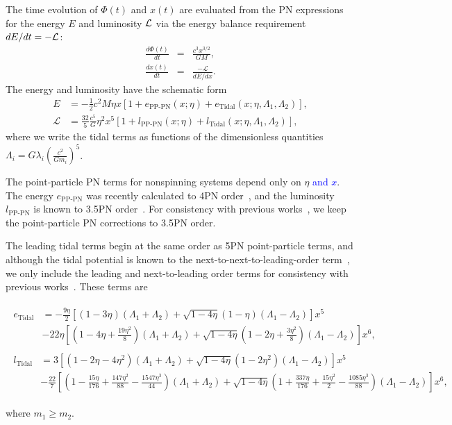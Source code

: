 \documentclass[twocolumn,prd,amssymb,aps,nofootinbib,showpacs,epsf]{revtex4}
\newcommand\les[2]{\textcolor{blue}{{#1}\sout{#2}}}
\begin{document}
The time evolution of $\Phi(t)$ and $x(t)$ are evaluated from the PN expressions for the energy $E$ and luminosity ${\cal L}$ via the energy balance requirement $dE/dt=-{\cal L}$:
\begin{eqnarray}
\label{eq:dPhidt}
\frac{d\Phi(t)}{dt}&=&\frac{c^3 x^{3/2}}{G M},\\
\label{eq:dxdt}
\frac{d x(t)}{dt}&=&\frac{-\mathcal{L}}{dE/dx}.
\end{eqnarray}
The energy and luminosity have the schematic form
\begin{align}
E &= - \frac{1}{2} c^2 M \eta x \left[1 + e_\text{PP-PN}(x; \eta) + e_\text{Tidal}(x; \eta, \Lambda_1, \Lambda_2)\right], \\
\mathcal{L} &= \frac{32}{5} \frac{c^5}{G} \eta^2 x^5 \left[ 1 + l_\text{PP-PN}(x; \eta) + l_\text{Tidal}(x; \eta, \Lambda_1, \Lambda_2)\right],
\end{align}
where we write the tidal terms as functions of the dimensionless quantities $\Lambda_i = G\lambda_i \left(\frac{c^2}{G m_i}\right)^5$.

The point-particle PN terms for nonspinning systems depend only on $\eta$ \les{and $x$}{}. The energy $e_\text{PP-PN}$ was recently calculated to 4PN order~\cite{BiniDamour2013, FoffaSturani2014}, and the luminosity $l_\text{PP-PN}$ is known to 3.5PN order~\cite{Blanchet2014Review}. For consistency with previous works~\cite{WadeCreightonOchsner2014, DelPozzoLiAgathos2013, Favata2014, YagiYunes2014}, we keep the point-particle PN corrections to 3.5PN order.

The leading tidal terms begin at the same order as 5PN point-particle terms, and although the tidal potential is known to the next-to-next-to-leading-order term~\cite{BiniDamourFaye2012}, we only include the leading and next-to-leading order terms for consistency with previous works~\cite{WadeCreightonOchsner2014, DelPozzoLiAgathos2013, Favata2014, YagiYunes2014}. These terms are~\cite{VinesFlanaganHinderer2011}
\begin{widetext}
\begin{align}
\begin{split}
e_\text{Tidal} &= -\frac{9\eta}{2} \left[ (1-3\eta)(\Lambda_1+\Lambda_2) + \sqrt{1-4\eta}(1-\eta)(\Lambda_1-\Lambda_2) \right]x^5 \\
& - 22\eta \left[ \left(1-4\eta+\frac{19\eta^2}{8}\right)(\Lambda_1+\Lambda_2) + \sqrt{1-4\eta}\left(1-2\eta+\frac{3\eta^2}{8}\right)(\Lambda_1-\Lambda_2) \right]x^6,
\end{split} \\
\begin{split}
l_\text{Tidal} &= 3 \left[ (1-2\eta-4\eta^2)(\Lambda_1+\Lambda_2) + \sqrt{1-4\eta}(1-2\eta^2)(\Lambda_1-\Lambda_2) \right]x^5 \\
& - \frac{22}{7} \left[ \left(1-\frac{15\eta}{176}+\frac{147\eta^2}{88}-\frac{1547\eta^3}{44}\right)(\Lambda_1+\Lambda_2) + \sqrt{1-4\eta}\left(1+\frac{337\eta}{176}+\frac{15\eta^2}{2}-\frac{1085\eta^3}{88}\right)(\Lambda_1-\Lambda_2) \right]x^6,
\end{split}
\end{align}
\end{widetext}
where $m_1 \ge m_2$.
\end{document}
